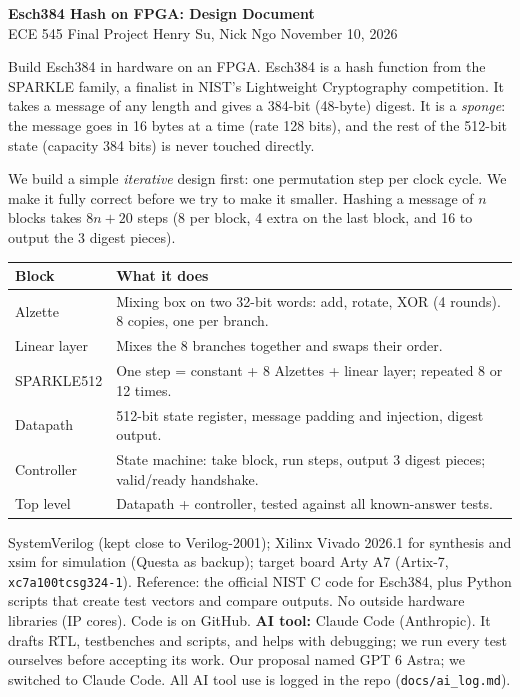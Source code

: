 \documentclass[10pt]{article}
\newcommand{\sect}[1]{\vspace{1pt}{\large\bfseries #1}\par}
\begin{document}
\begin{center}
{\Large\bfseries Esch384 Hash on FPGA: Design Document}\\[2pt]
ECE 545 Final Project \quad\textbullet\quad Henry Su, Nick Ngo \quad\textbullet\quad November 10, 2026
\end{center}

\sect{Goal}
Build Esch384 in hardware on an FPGA. Esch384 is a hash function from the
SPARKLE family, a finalist in NIST's Lightweight Cryptography competition.
It takes a message of any length and gives a 384-bit (48-byte) digest.
It is a \emph{sponge}: the message goes in 16 bytes at a time (rate 128 bits),
and the rest of the 512-bit state (capacity 384 bits) is never touched directly.

\sect{Design strategy}
We build a simple \emph{iterative} design first: one permutation step per clock cycle.
We make it fully correct before we try to make it smaller.
Hashing a message of $n$ blocks takes $8n+20$ steps (8 per block, 4 extra on the last block,
and 16 to output the 3 digest pieces).

\sect{Components}
{\small\begin{tabular}{@{}ll@{}}
\toprule
Block & What it does \\
\midrule
Alzette & Mixing box on two 32-bit words: add, rotate, XOR (4 rounds). 8 copies, one per branch. \\
Linear layer & Mixes the 8 branches together and swaps their order. \\
SPARKLE512 & One step = constant + 8 Alzettes + linear layer; repeated 8 or 12 times. \\
Datapath & 512-bit state register, message padding and injection, digest output. \\
Controller & State machine: take block, run steps, output 3 digest pieces; valid/ready handshake. \\
Top level & Datapath + controller, tested against all known-answer tests. \\
\bottomrule
\end{tabular}}

\sect{Tools and libraries}
SystemVerilog (kept close to Verilog-2001); Xilinx Vivado 2026.1 for synthesis and xsim for
simulation (Questa as backup); target board Arty A7 (Artix-7, \texttt{xc7a100tcsg324-1}).
Reference: the official NIST C code for Esch384, plus Python scripts that create test vectors and
compare outputs. No outside hardware libraries (IP cores). Code is on GitHub.
\textbf{AI tool:} Claude Code (Anthropic). It drafts RTL, testbenches and scripts, and helps with
debugging; we run every test ourselves before accepting its work. Our proposal named GPT 6 Astra;
we switched to Claude Code. All AI tool use is logged in the repo (\texttt{docs/ai\_log.md}).
\end{document}
